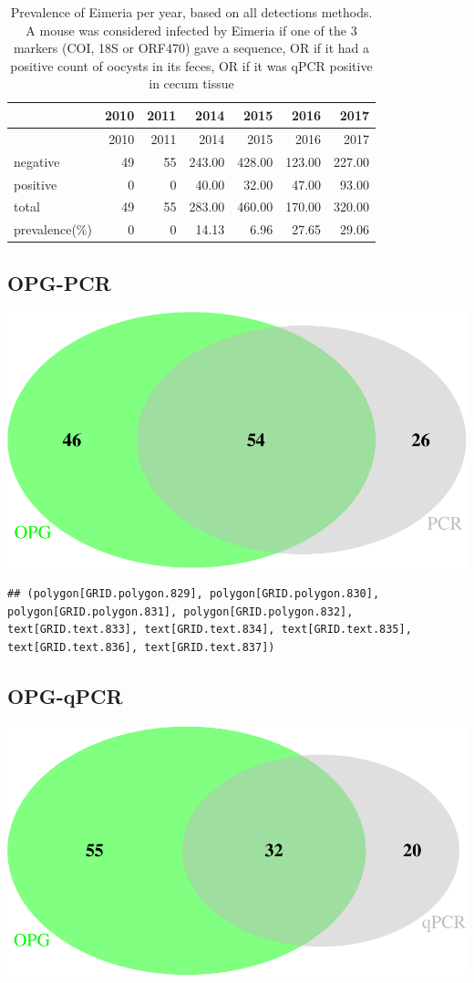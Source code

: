 \documentclass[]{article}
\begin{document}
\begin{longtable}[]{@{}lrrrrrr@{}}
\caption{Prevalence of Eimeria per year, based on all detections
methods. A mouse was considered infected by Eimeria if one of the 3
markers (COI, 18S or ORF470) gave a sequence, OR if it had a positive
count of oocysts in its feces, OR if it was qPCR positive in cecum
tissue}\tabularnewline
\toprule
& 2010 & 2011 & 2014 & 2015 & 2016 & 2017\tabularnewline
\midrule
\endfirsthead
\toprule
& 2010 & 2011 & 2014 & 2015 & 2016 & 2017\tabularnewline
\midrule
\endhead
negative & 49 & 55 & 243.00 & 428.00 & 123.00 & 227.00\tabularnewline
positive & 0 & 0 & 40.00 & 32.00 & 47.00 & 93.00\tabularnewline
total & 49 & 55 & 283.00 & 460.00 & 170.00 & 320.00\tabularnewline
prevalence(\%) & 0 & 0 & 14.13 & 6.96 & 27.65 & 29.06\tabularnewline
\bottomrule
\end{longtable}

\subsection{OPG-PCR}\label{opg-pcr}

\includegraphics{Data_Analysis_Alice_files/figure-latex/opgpcr-1.pdf}

\begin{verbatim}
## (polygon[GRID.polygon.829], polygon[GRID.polygon.830], polygon[GRID.polygon.831], polygon[GRID.polygon.832], text[GRID.text.833], text[GRID.text.834], text[GRID.text.835], text[GRID.text.836], text[GRID.text.837])
\end{verbatim}

\subsection{OPG-qPCR}\label{opg-qpcr}

\includegraphics{Data_Analysis_Alice_files/figure-latex/opgpcrVenn-1.pdf}
\end{document}
